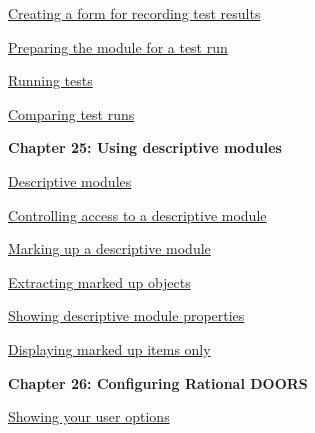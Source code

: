 \documentclass[11pt,a4paper]{article}
\begin{document}
\href{https://www.ibm.com/support/knowledgecenter/search/Creating%20a%20form%20for%20recording%20test%20results?scope=SSYQBZ_9.6.1}{Creating a form for recording test results}

\href{https://www.ibm.com/support/knowledgecenter/search/Preparing%20the%20module%20for%20a%20test%20run?scope=SSYQBZ_9.6.1}{Preparing the module for a test run}

\href{https://www.ibm.com/support/knowledgecenter/search/Running%20tests?scope=SSYQBZ_9.6.1}{Running tests}

\href{https://www.ibm.com/support/knowledgecenter/search/Comparing%20test%20runs?scope=SSYQBZ_9.6.1}{Comparing test runs} \\



\begin{Large}\textbf{Chapter 25: Using descriptive modules} \end{Large} 
\vspace{1mm}

\href{https://www.ibm.com/support/knowledgecenter/search/Descriptive%20modules?scope=SSYQBZ_9.6.1}{Descriptive modules}

\href{https://www.ibm.com/support/knowledgecenter/search/Controlling%20access%20to%20a%20descriptive%20module?scope=SSYQBZ_9.6.1}{Controlling access to a descriptive module}

\href{https://www.ibm.com/support/knowledgecenter/search/Marking%20up%20a%20descriptive%20module?scope=SSYQBZ_9.6.1}{Marking up a descriptive module}

\href{https://www.ibm.com/support/knowledgecenter/search/Extracting%20marked%20up%20objects?scope=SSYQBZ_9.6.1}{Extracting marked up objects}

\href{https://www.ibm.com/support/knowledgecenter/search/Showing%20descriptive%20module%20properties?scope=SSYQBZ_9.6.1}{Showing descriptive module properties}

\href{https://www.ibm.com/support/knowledgecenter/search/Displaying%20marked%20up%20items%20only?scope=SSYQBZ_9.6.1}{Displaying marked up items only} \\

\newpage

\begin{Large}\textbf{Chapter 26: Configuring Rational DOORS} \end{Large} 
\vspace{1mm}

\href{https://www.ibm.com/support/knowledgecenter/search/Showing%20your%20user%20options?scope=SSYQBZ_9.6.1}{Showing your user options}
\end{document}
